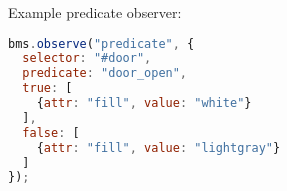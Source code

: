 
Example predicate observer:

\begin{lstlisting}[language=JavaScript]
bms.observe("predicate", {
  selector: "#door",
  predicate: "door_open",
  true: [
    {attr: "fill", value: "white"}
  ],
  false: [
    {attr: "fill", value: "lightgray"}
  ]
});
\end{lstlisting}

%
%
%
%

